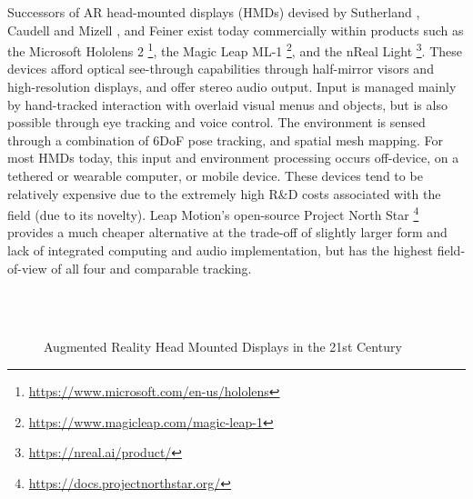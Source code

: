 Successors of AR head-mounted displays (HMDs) devised by Sutherland \citeyearpar{sutherland1968}, Caudell and Mizell \citeyearpar{caudell1992}, and Feiner \citeyearpar{feiner1993,feiner1997} exist today commercially within products such as the Microsoft Hololens 2 \footnote{\url{https://www.microsoft.com/en-us/hololens}}, the Magic Leap ML-1 \footnote{\url{https://www.magicleap.com/magic-leap-1}}, and the nReal Light \footnote{\url{https://nreal.ai/product/}}. These devices afford optical see-through capabilities through half-mirror visors and high-resolution displays, and offer stereo audio output. Input is managed mainly by hand-tracked interaction with overlaid visual menus and objects, but is also possible through eye tracking and voice control. The environment is sensed through a combination of 6DoF pose tracking, and spatial mesh mapping. For most HMDs today, this input and environment processing occurs off-device, on a tethered or wearable computer, or mobile device. These devices tend to be relatively expensive due to the extremely high R\&D costs associated with the field (due to its novelty). Leap Motion's open-source Project North Star \footnote{\url{https://docs.projectnorthstar.org/}} provides a much cheaper alternative at the trade-off of slightly larger form and lack of integrated computing and audio implementation, but has the highest field-of-view of all four and comparable tracking.

\begin{figure}
    \centering
    \captionsetup{justification=centering}
    \quad
    \hfill
    \\
    \vspace{0.5cm}
    \quad
    \hfill
    \\
    \caption{Augmented Reality Head Mounted Displays in the 21st Century}
    \label{fig: contemporaryHMDs}
\end{figure}

